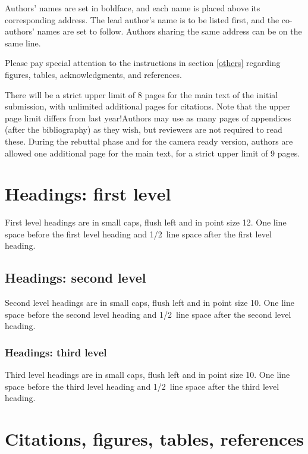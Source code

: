 \documentclass{article}
\begin{document}
Authors' names are
set in boldface, and each name is placed above its corresponding
address. The lead author's name is to be listed first, and
the co-authors' names are set to follow. Authors sharing the
same address can be on the same line.

Please pay special attention to the instructions in section \ref{others}
regarding figures, tables, acknowledgments, and references.


There will be a strict upper limit of 8 pages for the main text of the initial submission, with unlimited additional pages for citations. Note that the upper page limit differs from last year!Authors may use as many pages of appendices (after the bibliography) as they wish, but reviewers are not required to read these. During the rebuttal phase and for the camera ready version, authors are allowed one additional page for the main text, for a strict upper limit of 9 pages.

\section*{Headings: first level}
\label{headings}

First level headings are in small caps,
flush left and in point size 12. One line space before the first level
heading and 1/2~line space after the first level heading.

\subsection*{Headings: second level}

Second level headings are in small caps,
flush left and in point size 10. One line space before the second level
heading and 1/2~line space after the second level heading.

\subsubsection*{Headings: third level}

Third level headings are in small caps,
flush left and in point size 10. One line space before the third level
heading and 1/2~line space after the third level heading.

\section*{Citations, figures, tables, references}
\label{others}
\end{document}
